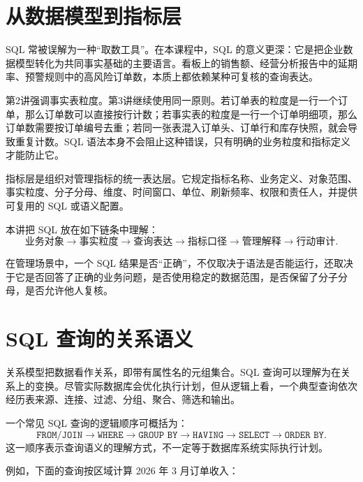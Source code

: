 \documentclass[UTF8,fontset=fandol,openany,zihao=-4]{ctexbook}
\begin{document}
\section{从数据模型到指标层}

SQL 常被误解为一种“取数工具”。在本课程中，SQL 的意义更深：它是把企业数据模型转化为共同事实基础的主要语言。看板上的销售额、经营分析报告中的延期率、预警规则中的高风险订单数，本质上都依赖某种可复核的查询表达。

第2讲强调事实表粒度。第3讲继续使用同一原则。若订单表的粒度是一行一个订单，那么订单数可以直接按行计数；若事实表的粒度是一行一个订单明细项，那么订单数需要按订单编号去重；若同一张表混入订单头、订单行和库存快照，就会导致重复计数。SQL 语法本身不会阻止这种错误，只有明确的业务粒度和指标定义才能防止它。

\begin{definition}[指标层]
指标层是组织对管理指标的统一表达层。它规定指标名称、业务定义、对象范围、事实粒度、分子分母、维度、时间窗口、单位、刷新频率、权限和责任人，并提供可复用的 SQL 或语义配置。
\end{definition}

本讲把 SQL 放在如下链条中理解：
\[
\text{业务对象}
\rightarrow
\text{事实粒度}
\rightarrow
\text{查询表达}
\rightarrow
\text{指标口径}
\rightarrow
\text{管理解释}
\rightarrow
\text{行动审计}.
\]

在管理场景中，一个 SQL 结果是否“正确”，不仅取决于语法是否能运行，还取决于它是否回答了正确的业务问题，是否使用稳定的数据范围，是否保留了分子分母，是否允许他人复核。

\section{SQL 查询的关系语义}

关系模型把数据看作关系，即带有属性名的元组集合。SQL 查询可以理解为在关系上的变换。尽管实际数据库会优化执行计划，但从逻辑上看，一个典型查询依次经历表来源、连接、过滤、分组、聚合、筛选和输出。

\begin{definition}
一个常见 SQL 查询的逻辑顺序可概括为：
\[
\texttt{FROM/JOIN}
\rightarrow
\texttt{WHERE}
\rightarrow
\texttt{GROUP BY}
\rightarrow
\texttt{HAVING}
\rightarrow
\texttt{SELECT}
\rightarrow
\texttt{ORDER BY}.
\]
这一顺序表示查询语义的理解方式，不一定等于数据库系统实际执行计划。
\end{definition}

例如，下面的查询按区域计算 2026 年 3 月订单收入：
\end{document}
